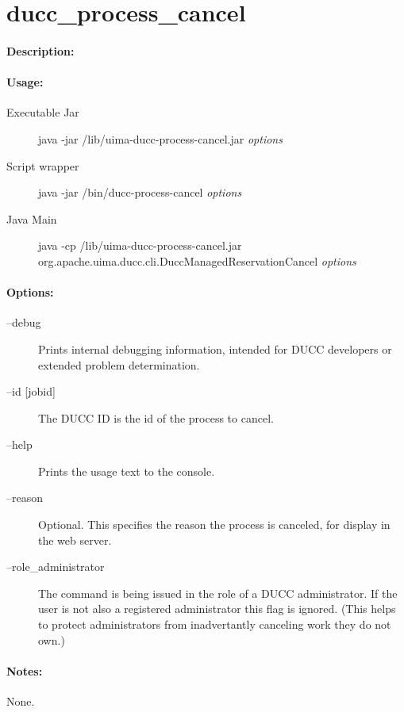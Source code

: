     \section{ducc\_process\_cancel}

    \paragraph{Description:}

    \paragraph{Usage:}
    \begin{description}
    \item[Executable Jar] java -jar \ducchome/lib/uima-ducc-process-cancel.jar {\em options}
    \item[Script wrapper] java -jar \ducchome/bin/ducc-process-cancel {\em options}
    \item[Java Main]      java -cp \ducchome/lib/uima-ducc-process-cancel.jar org.apache.uima.ducc.cli.DuccManagedReservationCancel {\em options}
    \end{description}

    \paragraph{Options:}
    \begin{description}
        \item[--debug ]          
          Prints internal debugging information, intended for DUCC developers or extended problem determination.          
        \item[--id {[jobid]}]
          The DUCC ID is the id of the process to cancel.
        \item[--help]
          Prints the usage text to the console.
        \item[--reason]
          Optional. This specifies the reason the process is canceled, for display in the web server. 
        \item[--role\_administrator] The command is being issued in the role of a DUCC administrator.
          If the user is not also a registered administrator this flag is ignored.  (This helps to
          protect administrators from inadvertantly canceling work they do not own.)
     \end{description}
        
    \paragraph{Notes:}
    None.

